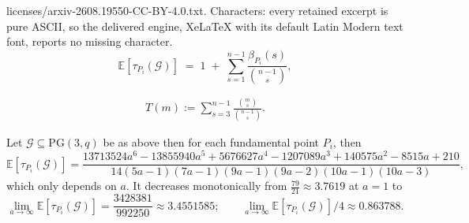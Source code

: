 \documentclass[10pt,a4paper]{amsart}
\newcommand{\E}{\mathbb{E}}
\newcommand{\Gscr}{\mathscr{G}}
\newcommand{\PG}{\mathrm{PG}}
\begin{document}
licenses/arxiv-2608.19550-CC-BY-4.0.txt. Characters: every retained excerpt is pure ASCII, so the delivered engine, XeLaTeX with its default Latin Modern text font, reports no missing character.
\begin{equation}\label{eq:beta}
\E[\tau_{P_i}(\Gscr)] \;=\; 1 \;+\; \sum_{s=1}^{n-1}\frac{\beta_{P_i}(s)}{\binom{n-1}{s}},
\end{equation}

\begin{align}
T(m):=\sum_{s=3}^{n-1}\frac{\binom{m}{s}}{\binom{n-1}{s}}. \label{eq:Tdef}
\end{align}

\begin{proposition}\label{lem:weakarc}
Let $\Gscr\subseteq\PG(3,q)$ be as above then for each fundamental point $P_i$, then
\[
\E[\tau_{P_i}(\Gscr)]
=\frac{13713524a^{6}-13855940a^{5}+5676627a^{4}-1207089a^{3}+140575a^{2}-8515a+210}
{14(5a-1)(7a-1)(9a-1)(9a-2)(10a-1)(10a-3)} ,
\]
which only depends on $a$. It decreases monotonically from
$\tfrac{79}{21}\approx3.7619$ at $a=1$ to
\[
\lim_{a\to\infty}\E[\tau_{P_i}(\Gscr)]=\frac{3428381}{992250}\approx3.4551585 ;\qquad \lim_{a\to\infty}\E[\tau_{P_i}(\Gscr)]/4\approx 0.863788.
\]
\end{proposition}
\end{document}

